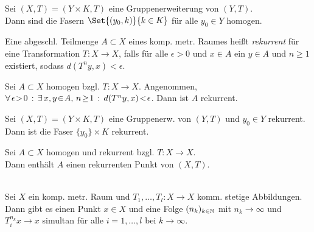 \documentclass{cheat-sheet}
\begin{document}
\begin{bsp}
  Sei $(X, T) = (Y \!\times\! K, T)$ eine Gruppenerweiterung von $(Y, T)$. \\
  Dann sind die Fasern $\Set{(y_0, k)}{k \in K}$ für alle $y_0 \in Y$ homogen.
\end{bsp}

\begin{defn}
  Eine abgeschl. Teilmenge $A \subset X$ eines komp. metr. Raumes heißt \emph{rekurrent} für eine Transformation $T : X \to X$, falls für alle $\epsilon \!>\! 0$ und $x \!\in\! A$ ein $y \!\in\! A$ und $n \!\geq\! 1$ existiert, sodass $d(T^n y, x) \!<\! \epsilon$.
\end{defn}

\begin{lem}
  Sei $A \subset X$ homogen bzgl. $T : X \to X$.
  Angenommen, $\fa{\epsilon \!>\! 0} \ex{x, y \!\in\! A, \, n \!\geq\! 1} d(T^n y, x) \!<\! \epsilon$. 
  Dann ist $A$ rekurrent.
\end{lem}

\begin{bsp}
  Sei $(X, T) \!=\! (Y \!\times\! K, T)$ eine Gruppenerw. von $(Y, T)$ und $y_0 \in Y$ rekurrent.
  Dann ist die Faser $\{ y_0 \} \times K$ rekurrent.
\end{bsp}

\begin{lem}
  Sei $A \subset X$ homogen und rekurrent bzgl. $T : X \to X$. \\
  Dann enthält $A$ einen rekurrenten Punkt von $(X, T)$.
\end{lem}




\begin{thm}\mbox{}\\
  Sei $X$ ein komp. metr. Raum und $T_1, \ldots, T_l : X \to X$ komm. stetige Abbildungen.
  Dann gibt es einen Punkt $x \!\in\! X$ und eine Folge $(n_k)_{k \in \mathbb{N}}$ mit $n_k \to \infty$ und $T_i^{n_k} x \to x$ simultan für alle $i = 1, \ldots, l$ bei $k \to \infty$.
\end{thm}

\end{document}
